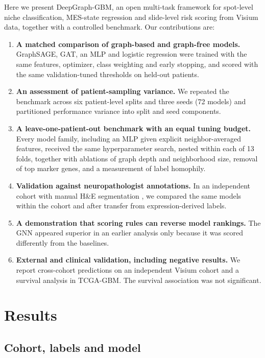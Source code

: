 \documentclass[11pt,letterpaper]{article}
\begin{document}
Here we present DeepGraph-GBM, an open multi-task framework for spot-level niche classification, MES-state regression and slide-level risk scoring from Visium data, together with a controlled benchmark. Our contributions are:
\begin{enumerate}
  \item \textbf{A matched comparison of graph-based and graph-free models.} GraphSAGE, GAT, an MLP and logistic regression were trained with the same features, optimizer, class weighting and early stopping, and scored with the same validation-tuned thresholds on held-out patients.
  \item \textbf{An assessment of patient-sampling variance.} We repeated the benchmark across six patient-level splits and three seeds (72 models) and partitioned performance variance into split and seed components.
  \item \textbf{A leave-one-patient-out benchmark with an equal tuning budget.} Every model family, including an MLP given explicit neighbor-averaged features, received the same hyperparameter search, nested within each of 13 folds, together with ablations of graph depth and neighborhood size, removal of top marker genes, and a measurement of label homophily.
  \item \textbf{Validation against neuropathologist annotations.} In an independent cohort with manual H\&E segmentation \cite{ravi2022,ritter2025}, we compared the same models within the cohort and after transfer from expression-derived labels.
  \item \textbf{A demonstration that scoring rules can reverse model rankings.} The GNN appeared superior in an earlier analysis only because it was scored differently from the baselines.
  \item \textbf{External and clinical validation, including negative results.} We report cross-cohort predictions on an independent Visium cohort and a survival analysis in TCGA-GBM. The survival association was not significant.
\end{enumerate}

\section{Results}

\subsection{Cohort, labels and model}
\end{document}
